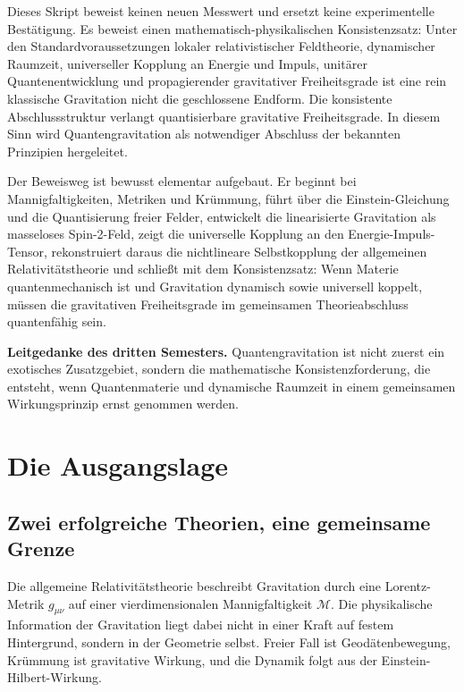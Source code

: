 \documentclass[11pt,a4paper]{book}
\theoremstyle{remark}
\newcommand{\M}{\mathcal{M}}
\begin{document}
Dieses Skript beweist keinen neuen Messwert und ersetzt keine experimentelle Bestätigung. Es beweist einen mathematisch-physikalischen Konsistenzsatz: Unter den Standardvoraussetzungen lokaler relativistischer Feldtheorie, dynamischer Raumzeit, universeller Kopplung an Energie und Impuls, unitärer Quantenentwicklung und propagierender gravitativer Freiheitsgrade ist eine rein klassische Gravitation nicht die geschlossene Endform. Die konsistente Abschlussstruktur verlangt quantisierbare gravitative Freiheitsgrade. In diesem Sinn wird Quantengravitation als notwendiger Abschluss der bekannten Prinzipien hergeleitet.

Der Beweisweg ist bewusst elementar aufgebaut. Er beginnt bei Mannigfaltigkeiten, Metriken und Krümmung, führt über die Einstein-Gleichung und die Quantisierung freier Felder, entwickelt die linearisierte Gravitation als masseloses Spin-2-Feld, zeigt die universelle Kopplung an den Energie-Impuls-Tensor, rekonstruiert daraus die nichtlineare Selbstkopplung der allgemeinen Relativitätstheorie und schließt mit dem Konsistenzsatz: Wenn Materie quantenmechanisch ist und Gravitation dynamisch sowie universell koppelt, müssen die gravitativen Freiheitsgrade im gemeinsamen Theorieabschluss quantenfähig sein.

\begin{merkkasten}
\textbf{Leitgedanke des dritten Semesters.} Quantengravitation ist nicht zuerst ein exotisches Zusatzgebiet, sondern die mathematische Konsistenzforderung, die entsteht, wenn Quantenmaterie und dynamische Raumzeit in einem gemeinsamen Wirkungsprinzip ernst genommen werden.
\end{merkkasten}

\chapter{Die Ausgangslage}
\section{Zwei erfolgreiche Theorien, eine gemeinsame Grenze}
Die allgemeine Relativitätstheorie beschreibt Gravitation durch eine Lorentz-Metrik $g_{\mu\nu}$ auf einer vierdimensionalen Mannigfaltigkeit $\M$. Die physikalische Information der Gravitation liegt dabei nicht in einer Kraft auf festem Hintergrund, sondern in der Geometrie selbst. Freier Fall ist Geodätenbewegung, Krümmung ist gravitative Wirkung, und die Dynamik folgt aus der Einstein-Hilbert-Wirkung.
\end{document}

